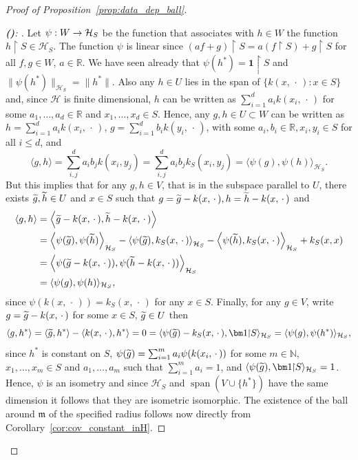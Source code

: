 \documentclass[10pt]{amsart}
\theoremstyle{definition}\newtheorem{defi}[theo]{Definition}\newtheorem{rema}[theo]{Remark}\newtheorem{exam}[theo]{Example}\newtheorem{exem}[theo]{Example}\newtheorem{nota}[theo]{Notation}
\theoremstyle{remark}
\DeclareMathOperator{\spn}{span}
\newcommand{\restrr}
{\!\!\upharpoonright\!\!}
\newcommand{\R}{\mathbb{R}}
\newcommand{\bbN}{\mathbb{N}}
\newcommand{\cH}{\mathcal{H}}
\newcommand{\mean}{\mathfrak{m}}
\let\oldtilde\tilde
\renewcommand*{\tilde}[1]{\mathchoice{\widetilde{#1}}{\widetilde{#1}}{\oldtilde{#1}}{\oldtilde{#1}}}
\renewcommand*{\to}{\mathchoice{\longrightarrow}{\rightarrow}{\rightarrow}{\rightarrow}}
\let\originalleft\left
\let\originalright\right
\renewcommand{\left}{\mathopen{}\mathclose\bgroup\originalleft}
\renewcommand{\right}{\aftergroup\egroup\originalright}
\newcounter{setofstep}
\newcounter{step}[setofstep]
\newenvironment{step}[1][]{\refstepcounter{step}\begin{proof}[{\textbf{(\thestep)}\if#1\empty\else: #1\fi}]}{\let\qed\relax\end{proof}}
\renewcommand{\thestep}{\alph{step}}
\newenvironment{proofc}[1][\proofname]{\begin{proof}[{#1}]}{\end{proof}}\AtBeginDocument{\special{pdf:mapfile +yhmath.map}}
\begin{document}
\begin{proofc}[{Proof of Proposition~\ref{prop:data_dep_ball}}]
\begin{step}
Let $\psi:W \to \cH_S$ be the function that associates with $h\in W$ the function $h\restrr S \in \cH_S$. The function $\psi$ is linear since $(a f+g)\restrr S = a (f\restrr S) +g\restrr S$ for all $f,g \in W$, $a\in \R$. We have seen already that $\psi(h^*) = \bm 1\restrr S$ and $\|\psi(h^*)\|_{\cH_S} = \|h^*\|$. Also any $h \in U$ lies in the span of $\{ k(x,\,\cdot\,) : x\in S\}$ and, since $\cH$ is finite dimensional, $h$ can be written as $\sum_{i=1}^d a_i k(x_i,\,\cdot\,)$ for some $a_1,\dots, a_d \in \R$ and $x_1,\dots, x_d \in S$. Hence, any $g,h \in U \subset W$ can be written as $h = \sum_{i=1}^d a_i k(x_i,\,\cdot\,)$, $g = \sum_{i=1}^d b_i k(y_i,\,\cdot\,)$, with some $a_i,b_i \in \R, x_i, y_i \in S$ for all $i\leq d$, and
\[
\langle g,h \rangle = \sum_{i,j}^d a_i b_j k(x_i,y_j) = \sum_{i,j}^d a_i b_j k_S(x_i,y_j) = \langle \psi(g), \psi(h) \rangle_{\cH_S}.
\]
But this implies that for any $g,h \in V$, that is in the subspace parallel to $U$, there exists $\tilde g, \tilde h \in U$ and $x\in S$ such that $g = \tilde g - k(x,\,\cdot\,), h = \tilde h - k(x,\,\cdot\,)$ and
\begin{align*}
\langle g,h \rangle &= \left\langle \tilde g - k(x,\,\cdot\,), \tilde h - k(x,\,\cdot\,) \right\rangle \\
&= \left\langle \psi(\tilde g), \psi(\tilde h) \right\rangle_{\cH_S} - \left\langle \psi(\tilde g), k_S(x,\,\cdot\,) \right\rangle_{\cH_S} - \left\langle \psi(\tilde h), k_S(x,\,\cdot\,) \right\rangle_{\cH_S} + k_S(x,x) \\
&= \left\langle \psi(\tilde g - k(x,\,\cdot\,)), \psi(\tilde h - k(x,\,\cdot\,)) \right\rangle_{\cH_S}\\
&= \langle \psi(g), \psi(h) \rangle_{\cH_S},
\end{align*}
since $\psi(k(x,\,\cdot\,)) = k_S(x,\,\cdot\,)$ for any $x\in S$. Finally, for any $g \in V$, write $g = \tilde g - k(x,\,\cdot\,)$ for some $x\in S$, $\tilde g \in U$ then
\[
\langle g, h^* \rangle = \langle \tilde g, h^* \rangle - \langle k(x,\,\cdot\,), h^* \rangle = 0 = \langle \psi(\tilde g) - k_S(x,\,\cdot\,), \bm 1\restrr S\rangle_{\cH_S} = \langle \psi(g),\psi(h^*) \rangle_{\cH_S},
\]
since $h^*$ is constant on $S$, $\psi(\tilde g) = \sum_{i=1}^m a_i \psi(k(x_i,\,\cdot\,))$ for some $m\in \bbN$, $x_1,\dots, x_m \in S$ and $a_1,\dots, a_m$ such that $\sum_{i=1}^m a_i = 1$, and $\langle \psi(\tilde g), \bm 1\restrr S \rangle_{\cH_S} = 1$. Hence, $\psi$ is an isometry and since $\cH_S$ and $\spn(V \cup \{h^*\})$ have the same dimension it follows that they are isometric isomorphic. The existence of the ball around $\mean$ of the specified radius follows now directly from Corollary~\ref{cor:cov_constant_inH}.\qedhere
\end{step}\let\qed\relax
\end{proofc}
\end{document}
